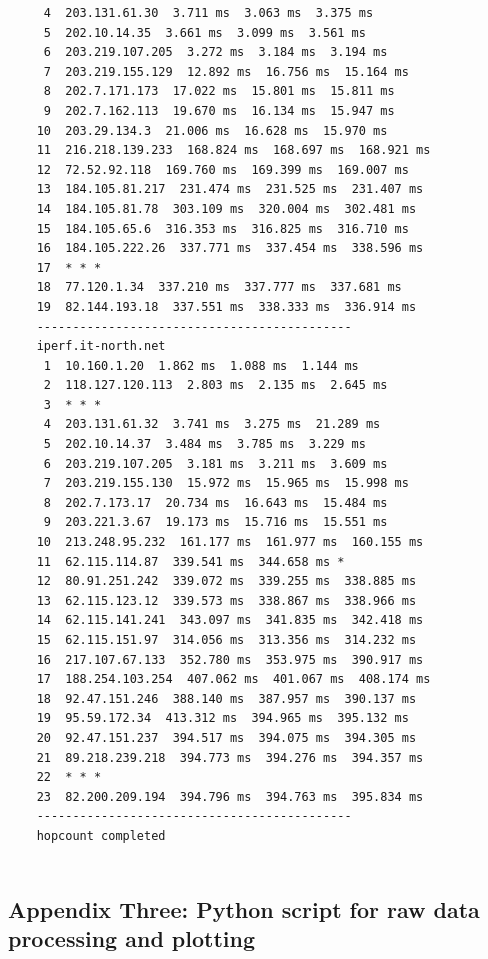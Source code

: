 \documentclass[paper=a4, fontsize=10pt]{scrartcl} %
\numberwithin{equation}{section} %
\numberwithin{figure}{section} %
\numberwithin{table}{section} %
\begin{document}
\begin{lstlisting}
     4  203.131.61.30  3.711 ms  3.063 ms  3.375 ms
     5  202.10.14.35  3.661 ms  3.099 ms  3.561 ms
     6  203.219.107.205  3.272 ms  3.184 ms  3.194 ms
     7  203.219.155.129  12.892 ms  16.756 ms  15.164 ms
     8  202.7.171.173  17.022 ms  15.801 ms  15.811 ms
     9  202.7.162.113  19.670 ms  16.134 ms  15.947 ms
    10  203.29.134.3  21.006 ms  16.628 ms  15.970 ms
    11  216.218.139.233  168.824 ms  168.697 ms  168.921 ms
    12  72.52.92.118  169.760 ms  169.399 ms  169.007 ms
    13  184.105.81.217  231.474 ms  231.525 ms  231.407 ms
    14  184.105.81.78  303.109 ms  320.004 ms  302.481 ms
    15  184.105.65.6  316.353 ms  316.825 ms  316.710 ms
    16  184.105.222.26  337.771 ms  337.454 ms  338.596 ms
    17  * * *
    18  77.120.1.34  337.210 ms  337.777 ms  337.681 ms
    19  82.144.193.18  337.551 ms  338.333 ms  336.914 ms
    --------------------------------------------
    iperf.it-north.net
     1  10.160.1.20  1.862 ms  1.088 ms  1.144 ms
     2  118.127.120.113  2.803 ms  2.135 ms  2.645 ms
     3  * * *
     4  203.131.61.32  3.741 ms  3.275 ms  21.289 ms
     5  202.10.14.37  3.484 ms  3.785 ms  3.229 ms
     6  203.219.107.205  3.181 ms  3.211 ms  3.609 ms
     7  203.219.155.130  15.972 ms  15.965 ms  15.998 ms
     8  202.7.173.17  20.734 ms  16.643 ms  15.484 ms
     9  203.221.3.67  19.173 ms  15.716 ms  15.551 ms
    10  213.248.95.232  161.177 ms  161.977 ms  160.155 ms
    11  62.115.114.87  339.541 ms  344.658 ms *
    12  80.91.251.242  339.072 ms  339.255 ms  338.885 ms
    13  62.115.123.12  339.573 ms  338.867 ms  338.966 ms
    14  62.115.141.241  343.097 ms  341.835 ms  342.418 ms
    15  62.115.151.97  314.056 ms  313.356 ms  314.232 ms
    16  217.107.67.133  352.780 ms  353.975 ms  390.917 ms
    17  188.254.103.254  407.062 ms  401.067 ms  408.174 ms
    18  92.47.151.246  388.140 ms  387.957 ms  390.137 ms
    19  95.59.172.34  413.312 ms  394.965 ms  395.132 ms
    20  92.47.151.237  394.517 ms  394.075 ms  394.305 ms
    21  89.218.239.218  394.773 ms  394.276 ms  394.357 ms
    22  * * *
    23  82.200.209.194  394.796 ms  394.763 ms  395.834 ms
    --------------------------------------------
    hopcount completed
    
\end{lstlisting}

\subsection*{Appendix Three: Python script for raw data processing and plotting}
\end{document}
